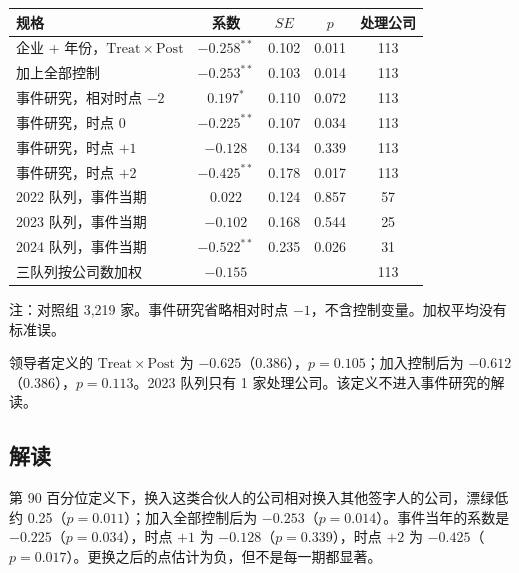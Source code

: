 \documentclass[11pt]{article}
\begin{document}
\begin{center}
\begin{threeparttable}
\caption{换入第 90 百分位合伙人}
\label{tab:did}
\begin{tabular}{lcccc}
\toprule
规格 & 系数 & \(SE\) & \(p\) & 处理公司 \\
\midrule
企业 + 年份，\(\mathrm{Treat}\times\mathrm{Post}\) & \(-0.258^{**}\) & 0.102 & 0.011 & 113 \\
加上全部控制 & \(-0.253^{**}\) & 0.103 & 0.014 & 113 \\
事件研究，相对时点 \(-2\) & \(0.197^{*}\) & 0.110 & 0.072 & 113 \\
事件研究，时点 \(0\) & \(-0.225^{**}\) & 0.107 & 0.034 & 113 \\
事件研究，时点 \(+1\) & \(-0.128\) & 0.134 & 0.339 & 113 \\
事件研究，时点 \(+2\) & \(-0.425^{**}\) & 0.178 & 0.017 & 113 \\
\midrule
2022 队列，事件当期 & \(0.022\) & 0.124 & 0.857 & 57 \\
2023 队列，事件当期 & \(-0.102\) & 0.168 & 0.544 & 25 \\
2024 队列，事件当期 & \(-0.522^{**}\) & 0.235 & 0.026 & 31 \\
三队列按公司数加权 & \(-0.155\) & & & 113 \\
\bottomrule
\end{tabular}
\begin{tablenotes}\footnotesize
\item 注：对照组 3,219 家。事件研究省略相对时点 \(-1\)，不含控制变量。加权平均没有标准误。
\end{tablenotes}
\end{threeparttable}
\end{center}

领导者定义的 \(\mathrm{Treat}\times\mathrm{Post}\) 为 \(-0.625\)（0.386），\(p=0.105\)；加入控制后为 \(-0.612\)（0.386），\(p=0.113\)。2023 队列只有 1 家处理公司。该定义不进入事件研究的解读。

\subsection{解读}

第 90 百分位定义下，换入这类合伙人的公司相对换入其他签字人的公司，漂绿低约 0.25（\(p=0.011\)）；加入全部控制后为 \(-0.253\)（\(p=0.014\)）。事件当年的系数是 \(-0.225\)（\(p=0.034\)），时点 \(+1\) 为 \(-0.128\)（\(p=0.339\)），时点 \(+2\) 为 \(-0.425\)（\(p=0.017\)）。更换之后的点估计为负，但不是每一期都显著。
\end{document}
